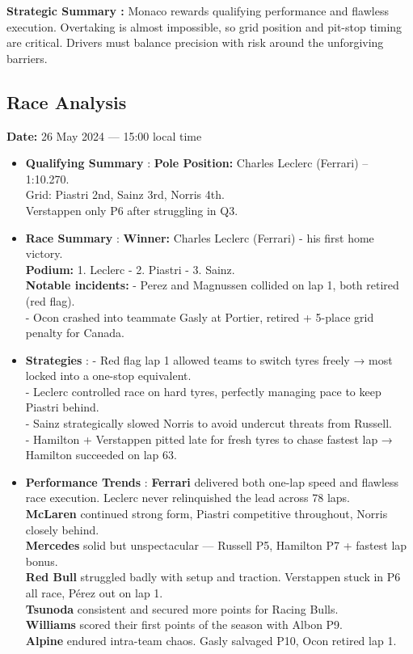 \textbf{Strategic Summary :}
Monaco rewards qualifying performance and flawless execution. Overtaking is almost impossible, so grid position and pit-stop timing are critical. Drivers must balance precision with risk around the unforgiving barriers.


\subsection{Race Analysis}

\textbf{Date:} 26 May 2024 — 15:00 local time 

\begin{itemize}
    \item \textbf{Qualifying Summary} : \textbf{Pole Position:} Charles Leclerc (Ferrari) – 1:10.270. \\
    Grid: Piastri 2nd, Sainz 3rd, Norris 4th.\\
    Verstappen only P6 after struggling in Q3.
    
    \item \textbf{Race Summary} : \textbf{Winner:} Charles Leclerc (Ferrari) - his first home victory.\\
    \textbf{Podium:} 1. Leclerc - 2. Piastri - 3. Sainz.\\
    \textbf{Notable incidents:} 
    - Perez and Magnussen collided on lap 1, both retired (red flag).\\
    - Ocon crashed into teammate Gasly at Portier, retired + 5-place grid penalty for Canada.
    
    \item \textbf{Strategies} : 
    - Red flag lap 1 allowed teams to switch tyres freely → most locked into a one-stop equivalent.\\ 
    - Leclerc controlled race on hard tyres, perfectly managing pace to keep Piastri behind. \\
    - Sainz strategically slowed Norris to avoid undercut threats from Russell. \\
    - Hamilton + Verstappen pitted late for fresh tyres to chase fastest lap → Hamilton succeeded on lap 63.
    
    \item \textbf{Performance Trends} : \textbf{Ferrari} delivered both one-lap speed and flawless race execution. Leclerc never relinquished the lead across 78 laps. \\
    \textbf{McLaren} continued strong form, Piastri competitive throughout, Norris closely behind. \\
    \textbf{Mercedes} solid but unspectacular — Russell P5, Hamilton P7 + fastest lap bonus. \\
    \textbf{Red Bull} struggled badly with setup and traction. Verstappen stuck in P6 all race, Pérez out on lap 1. \\
    \textbf{Tsunoda} consistent and secured more points for Racing Bulls. \\
    \textbf{Williams} scored their first points of the season with Albon P9. \\
    \textbf{Alpine} endured intra-team chaos. Gasly salvaged P10, Ocon retired lap 1. \\
    

\end{itemize}
